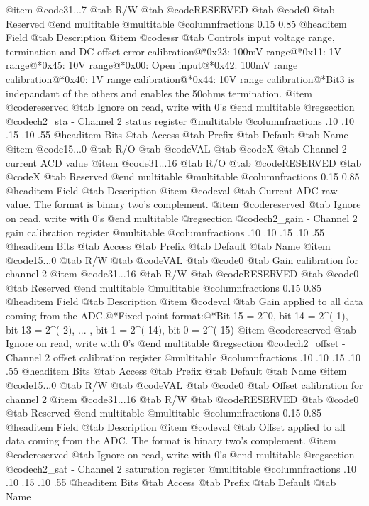 @item @code{31...7}
@tab R/W @tab
@code{RESERVED}
@tab @code{0} @tab 
Reserved
@end multitable
@multitable @columnfractions 0.15 0.85
@headitem Field @tab Description
@item @code{ssr} @tab Controls input voltage range, termination and DC offset error calibration@*0x23: 100mV range@*0x11: 1V range@*0x45: 10V range@*0x00: Open input@*0x42: 100mV range calibration@*0x40: 1V range calibration@*0x44: 10V range calibration@*Bit3 is indepandant of the others and enables the 50ohms termination.
@item @code{reserved} @tab Ignore on read, write with 0's
@end multitable
@regsection @code{ch2_sta} - Channel 2 status register
@multitable @columnfractions .10 .10 .15 .10 .55
@headitem Bits @tab Access @tab Prefix @tab Default @tab Name
@item @code{15...0}
@tab R/O @tab
@code{VAL}
@tab @code{X} @tab 
Channel 2 current ACD value
@item @code{31...16}
@tab R/O @tab
@code{RESERVED}
@tab @code{X} @tab 
Reserved
@end multitable
@multitable @columnfractions 0.15 0.85
@headitem Field @tab Description
@item @code{val} @tab Current ADC raw value. The format is binary two's complement.
@item @code{reserved} @tab Ignore on read, write with 0's
@end multitable
@regsection @code{ch2_gain} - Channel 2 gain calibration register
@multitable @columnfractions .10 .10 .15 .10 .55
@headitem Bits @tab Access @tab Prefix @tab Default @tab Name
@item @code{15...0}
@tab R/W @tab
@code{VAL}
@tab @code{0} @tab 
Gain calibration for channel 2
@item @code{31...16}
@tab R/W @tab
@code{RESERVED}
@tab @code{0} @tab 
Reserved
@end multitable
@multitable @columnfractions 0.15 0.85
@headitem Field @tab Description
@item @code{val} @tab Gain applied to all data coming from the ADC.@*Fixed point format:@*Bit 15 = 2^0, bit 14 = 2^(-1), bit 13 = 2^(-2), ... , bit 1 = 2^(-14), bit 0 = 2^(-15)
@item @code{reserved} @tab Ignore on read, write with 0's
@end multitable
@regsection @code{ch2_offset} - Channel 2 offset calibration register
@multitable @columnfractions .10 .10 .15 .10 .55
@headitem Bits @tab Access @tab Prefix @tab Default @tab Name
@item @code{15...0}
@tab R/W @tab
@code{VAL}
@tab @code{0} @tab 
Offset calibration for channel 2
@item @code{31...16}
@tab R/W @tab
@code{RESERVED}
@tab @code{0} @tab 
Reserved
@end multitable
@multitable @columnfractions 0.15 0.85
@headitem Field @tab Description
@item @code{val} @tab Offset applied to all data coming from the ADC. The format is binary two's complement.
@item @code{reserved} @tab Ignore on read, write with 0's
@end multitable
@regsection @code{ch2_sat} - Channel 2 saturation register
@multitable @columnfractions .10 .10 .15 .10 .55
@headitem Bits @tab Access @tab Prefix @tab Default @tab Name
